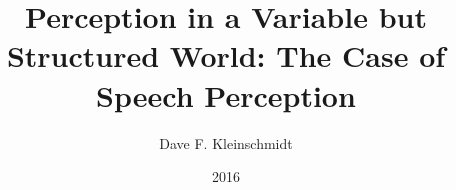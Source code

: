 \documentclass[12pt]{report}
\begin{document}
\title{Perception in a Variable but Structured World: The Case of Speech Perception}
\author{Dave F. Kleinschmidt}
\date{2016}
\maketitle









\tableofcontents
\listoftables
\listoffigures





\graphicspath{{chapters/02_ideal_adapter/}}


\graphicspath{{chapters/03_selective_adaptation/}}


\graphicspath{{chapters/04_infer_prior/}}


\graphicspath{{chapters/05_talker_variation/}}




\printbibliography[heading=bibintoc,title={References}]

\appendix

\graphicspath{{chapters/02_ideal_adapter/}}

\end{document}
